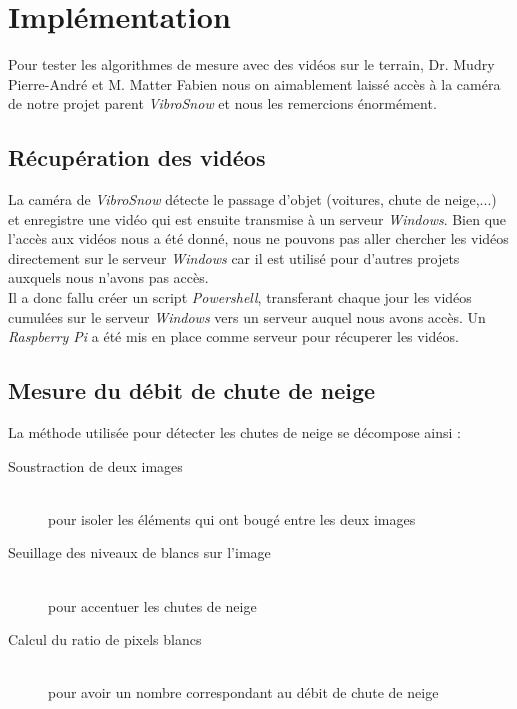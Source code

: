 
\section{Implémentation}
Pour tester les algorithmes de mesure avec des vidéos sur le terrain,
Dr. Mudry Pierre-André et M. Matter Fabien nous on aimablement laissé accès à
la caméra de notre projet parent \emph{VibroSnow\cite{VibroSnow}} et nous
les remercions énormément.

\subsection{Récupération des vidéos}
La caméra de \emph{VibroSnow} détecte le passage d'objet (voitures, chute de neige,...) et
enregistre une vidéo qui est ensuite transmise à un serveur \emph{Windows}.
Bien que l'accès aux vidéos nous a été donné, nous ne pouvons pas aller chercher les vidéos
directement sur le serveur \emph{Windows} car il est utilisé pour d'autres projets auxquels nous
n'avons pas accès.\\
Il a donc fallu créer un script \emph{Powershell}, transferant chaque jour les vidéos
cumulées sur le serveur \emph{Windows} vers un serveur auquel nous avons accès.
Un \emph{Raspberry Pi} a été mis en place comme serveur pour récuperer les vidéos.

\subsection{Mesure du débit de chute de neige}
La méthode utilisée pour détecter les chutes de neige se décompose ainsi :
\begin{description}
    \item[Soustraction de deux images] \hfill \\
    pour isoler les éléments qui ont bougé entre les deux images
    \item[Seuillage des niveaux de blancs sur l'image] \hfill \\
    pour accentuer les chutes de neige
    \item[Calcul du ratio de pixels blancs] \hfill \\
    pour avoir un nombre correspondant au débit de chute de neige    
\end{description}

